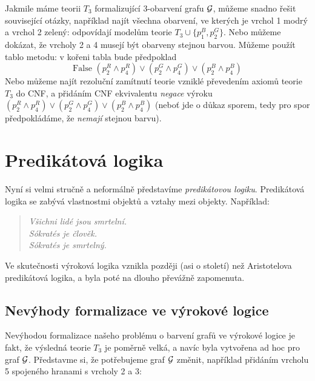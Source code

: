 Jakmile máme teorii \(T_3\) formalizující 3-obarvení grafu \( \mathcal{G} \), můžeme snadno řešit související otázky, například najít všechna obarvení, ve kterých je vrchol 1 modrý a vrchol 2 zelený: odpovídají modelům teorie \( T_3 \cup \{ p_1^B, p_2^G\} \). Nebo můžeme dokázat, že vrcholy 2 a 4 musejí být obarveny stejnou barvou. Můžeme použít tablo metodu: v kořeni tabla bude předpoklad
\[
\text{False  }(p_2^R \land p_4^R)\lor(p_2^G \land p_4^G)\lor(p_2^B \land p_4^B)
\]
Nebo můžeme najít rezoluční zamítnutí teorie vzniklé převedením axiomů teorie \( T_3 \) do CNF, a přidáním CNF ekvivalentu \emph{negace} výroku \( (p_2^R \land p_4^R)\lor(p_2^G \land p_4^G)\lor(p_2^B \land p_4^B) \)	(neboť jde o důkaz sporem, tedy pro spor předpokládáme, že \emph{nemají} stejnou barvu).



\section{Predikátová logika}

Nyní si velmi stručně a neformálně představíme \emph{predikátovou logiku}. Predikátová logika se zabývá vlastnostmi objektů a vztahy mezi objekty. Například:
\begin{quote}\it
    Všichni lidé jsou smrtelní.\\
    Sókratés je člověk.\\
    Sókratés je smrtelný.
\end{quote}
Ve skutečnosti výroková logika vznikla později (asi o století) než Aristotelova predikátová logika, a byla poté na dlouho převážně zapomenuta.


\subsection{Nevýhody formalizace ve výrokové logice}\label{subsection:disadvantages-of-propositional-logic}

Nevýhodou formalizace našeho problému o barvení grafů ve výrokové logice je fakt, že výsledná teorie \( T_3 \) je poměrně velká, a navíc byla vytvořena ad hoc pro graf  \( \mathcal{G} \). Představme si, že potřebujeme graf \( \mathcal{G} \) změnit, například přidáním vrcholu 5 spojeného hranami s vrcholy 2 a 3:

\begin{center}
\end{center}


